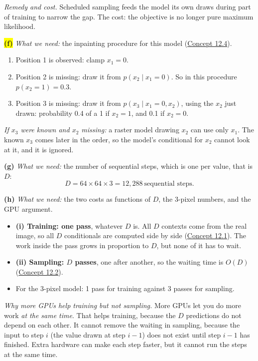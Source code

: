 \documentclass[12pt,a4paper]{article}
\begin{document}
\emph{Remedy and cost.} Scheduled sampling feeds the model its own draws during part of training to narrow the gap. The cost: the objective is no longer pure maximum likelihood.

\colorbox{yellow}{\textbf{(f)}} \emph{What we need:} the inpainting procedure for this model (\hyperref[c12-4]{Concept 12.4}).
\begin{enumerate}[nosep]
  \item Position 1 is observed: clamp $x_1=0$.
  \item Position 2 is missing: draw it from $p(x_2\mid x_1=0)$. So in this procedure $p(x_2=1)=\mathbf{0.3}$.
  \item Position 3 is missing: draw it from $p(x_3\mid x_1=0,x_2)$, using the $x_2$ just drawn: probability 0.4 of a 1 if $x_2=1$, and 0.1 if $x_2=0$.
\end{enumerate}
\emph{If $x_3$ were known and $x_2$ missing:} a raster model drawing $x_2$ can use only $x_1$. The known $x_3$ comes later in the order, so the model's conditional for $x_2$ cannot look at it, and it is ignored.

\textbf{(g)} \emph{What we need:} the number of sequential steps, which is one per value, that is $D$:
\[
D=64\times64\times3=12{,}288\ \text{sequential steps}.
\]

\textbf{(h)} \emph{What we need:} the two costs as functions of $D$, the 3-pixel numbers, and the GPU argument.
\begin{itemize}[nosep]
  \item \textbf{(i) Training: one pass}, whatever $D$ is. All $D$ contexts come from the real image, so all $D$ conditionals are computed side by side (\hyperref[c12-1]{Concept 12.1}). The work inside the pass grows in proportion to $D$, but none of it has to wait.
  \item \textbf{(ii) Sampling: $D$ passes}, one after another, so the waiting time is $O(D)$ (\hyperref[c12-2]{Concept 12.2}).
  \item For the 3-pixel model: 1 pass for training against 3 passes for sampling.
\end{itemize}
\emph{Why more GPUs help training but not sampling.} More GPUs let you do more work \emph{at the same time}. That helps training, because the $D$ predictions do not depend on each other. It cannot remove the waiting in sampling, because the input to step $i$ (the value drawn at step $i-1$) does not exist until step $i-1$ has finished. Extra hardware can make each step faster, but it cannot run the steps at the same time.
\newpage
\end{document}
